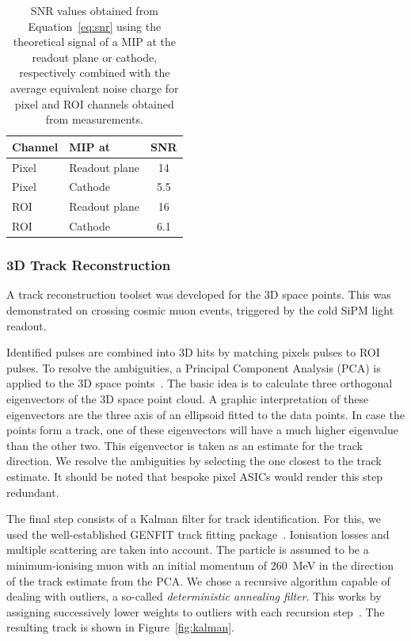 \documentclass[a4paper]{article}
\begin{document}
\begin{table}[htb]
	\centering
	\caption{SNR values obtained from Equation~\eqref{eq:snr} using the theoretical signal of a MIP at the readout plane or cathode, respectively combined with the average equivalent noise charge for pixel and ROI channels obtained from measurements.}
	\label{tab:snr}
	\begin{tabu} to \textwidth {llS}
		{Channel} &	{MIP at} &			{SNR} \\
		\hline
		{Pixel} &	{Readout plane} &	\num{14} \\
		{Pixel} &	{Cathode} &			\num{5.5} \\
		{ROI} &		{Readout plane} &	\num{16} \\
		{ROI} &		{Cathode} &			\num{6.1} \\
		
	\end{tabu}
\end{table}


\subsubsection{3D Track Reconstruction}
A track reconstruction toolset was developed for the 3D space points. 
This was demonstrated on crossing cosmic muon events, triggered by the cold SiPM light readout.  

Identified pulses are combined into 3D hits by matching pixels pulses to ROI pulses.
To resolve the ambiguities, a Principal Component Analysis (PCA) is applied to the 3D space points~\cite{pca}.
The basic idea is to calculate three orthogonal eigenvectors of the 3D space point cloud.
A graphic interpretation of these eigenvectors are the three axis of an ellipsoid fitted to the data points.
In case the points form a track, one of these eigenvectors will have a much higher eigenvalue than the other two.
This eigenvector is taken as an estimate for the track direction.
We resolve the ambiguities by selecting the one closest to the track estimate.
It should be noted that bespoke pixel ASICs would render this step redundant. 

The final step consists of a Kalman filter for track identification.
For this, we used the well-established GENFIT track fitting package~\cite{genfit1, genfit2}.
Ionisation losses and multiple scattering are taken into account.
The particle is assumed to be a minimum-ionising muon with an initial momentum of \SI{260}{\mega\electronvolt} in the direction of the track estimate from the PCA.
We chose a recursive algorithm capable of dealing with outliers, a so-called \emph{deterministic annealing filter}.
This works by assigning successively lower weights to outliers with each recursion step~\cite{genfit1, genfit2}.
The resulting track is shown in Figure~\ref{fig:kalman}.
\end{document}
